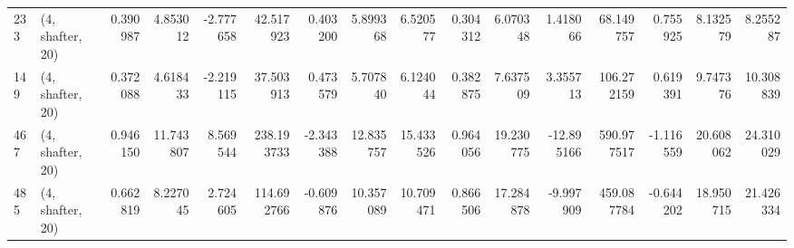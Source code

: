 \begin{tabular}{llrrrrrrrrrrrrrr}
233 &  (4, shafter, 20) &   0.390987 &   4.853012 &  -2.777658 &    42.517923 &   0.403200 &   5.899368 &   6.520577 &  0.304312 &   6.070348 &   1.418066 &    68.149757 &   0.755925 &   8.132579 &   8.255287 \\
149 &  (4, shafter, 20) &   0.372088 &   4.618433 &  -2.219115 &    37.503913 &   0.473579 &   5.707840 &   6.124044 &  0.382875 &   7.637509 &   3.355713 &   106.272159 &   0.619391 &   9.747376 &  10.308839 \\
467 &  (4, shafter, 20) &   0.946150 &  11.743807 &   8.569544 &   238.193733 &  -2.343388 &  12.835757 &  15.433526 &  0.964056 &  19.230775 & -12.895166 &   590.977517 &  -1.116559 &  20.608062 &  24.310029 \\
485 &  (4, shafter, 20) &   0.662819 &   8.227045 &   2.724605 &   114.692766 &  -0.609876 &  10.357089 &  10.709471 &  0.866506 &  17.284878 &  -9.997909 &   459.087784 &  -0.644202 &  18.950715 &  21.426334 \\
\bottomrule
\end{tabular}
